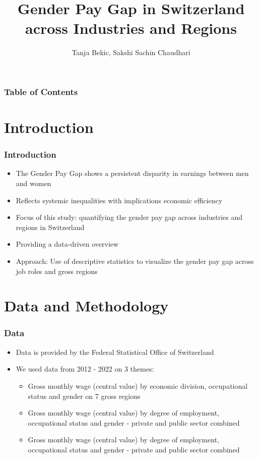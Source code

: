 \documentclass{beamer}
\title{Gender Pay Gap in Switzerland across Industries and Regions}
\institute{University of Zurich}
\author{Tanja Bekic, Sakshi Sachin Chaudhari}
\begin{document}
\begin{frame}
\titlepage 
\end{frame}

\begin{frame}
\frametitle{Table of Contents}
\tableofcontents
\end{frame}

\section{Introduction}
\begin{frame}
\frametitle{Introduction}
\begin{itemize}
  \item The Gender Pay Gap shows a persistent disparity in earnings between men and women
  \item Reflects systemic inequalities with implications economic efficiency
  \item Focus of this study: quantifying the gender pay gap across industries and regions in Switzerland 
  \item Providing a data-driven overview 
  \item Approach: Use of descriptive statistics to visualize the gender pay gap across job roles and gross regions
\end{itemize}
\end{frame}

\section{Data and Methodology}
\begin{frame}
\frametitle{Data}
\begin{itemize}
  \item Data is provided by the Federal Statistical Office of Switzerland
  \item We used data from 2012 - 2022 on 3 themes: 
  \begin{itemize}
    \item Gross monthly wage (central value) by economic division, occupational status and gender on 7 gross regions
    \item Gross monthly wage (central value) by degree of employment, occupational status and gender - private and public sector combined
    \item Gross monthly wage (central value) by degree of employment, occupational status and gender - private and public sector combined
  \end{itemize}  
  \end{itemize}
\end{frame}
\end{document}
